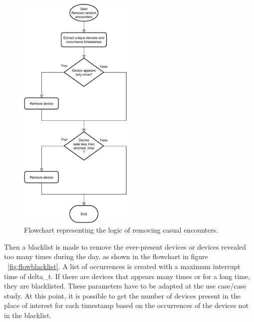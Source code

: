 \begin{figure}[h]
\centering 
\includegraphics[width=0.5\textwidth]{images/flowrandom} 
\caption{Flowchart representing the logic of removing casual encounters.}
\label{fig:flowrandom}
\end{figure}

Then a blacklist is made to remove the ever-present devices or devices revealed too many times during the day, as shown in the flowchart in figure ~\ref{fig:flowblacklist}. A list of occurrences is created with a maximum interrupt time of delta\_t. If there are devices that appears many times or for a long time, they are blacklisted. These parameters have to be adapted at the use case/case study.
At this point, it is possible to get the number of devices present in the place of interest for each timestamp based on the occurrences of the devices not in the blacklist. 

